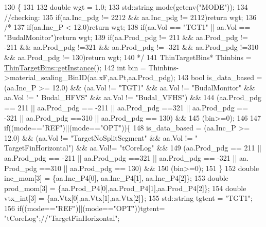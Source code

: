 \begin{DoxyCode}
130                                                                                \{
131 
132     \textcolor{keywordtype}{double} wgt = 1.0;
133     std::string mode(getenv(\textcolor{stringliteral}{"MODE"}));
134     \textcolor{comment}{//checking:}
135     \textcolor{keywordflow}{if}(aa.Inc\_pdg != 2212 && aa.Inc\_pdg != 2112)\textcolor{keywordflow}{return} wgt;
136     \textcolor{comment}{/*}
137 \textcolor{comment}{      if(aa.Inc\_P < 12.0)return wgt;}
138 \textcolor{comment}{      if(aa.Vol == "TGT1" || aa.Vol == "BudalMonitor")return wgt;}
139 \textcolor{comment}{      if(aa.Prod\_pdg != 211 && aa.Prod\_pdg != -211 && aa.Prod\_pdg !=321 && aa.Prod\_pdg != -321 &&
       aa.Prod\_pdg !=310 && aa.Prod\_pdg != 130)return wgt;}
140 \textcolor{comment}{    */}
141     ThinTargetBins*  Thinbins =  \hyperlink{class_neutrino_flux_reweight_1_1_thin_target_bins_aeff5cf7220dd08322f5abac2cbc7ff33}{ThinTargetBins::getInstance}();
142     \textcolor{keywordtype}{int} bin = Thinbins->material\_scaling\_BinID(aa.xF,aa.Pt,aa.Prod\_pdg);
143     \textcolor{keywordtype}{bool} is\_data\_based = (aa.Inc\_P >= 12.0) && (aa.Vol != \textcolor{stringliteral}{"TGT1"} && aa.Vol != \textcolor{stringliteral}{"BudalMonitor"} && aa.Vol != \textcolor{stringliteral}{"
      Budal\_HFVS"} && aa.Vol != \textcolor{stringliteral}{"Budal\_VFHS"}) && 
144       (aa.Prod\_pdg == 211 || aa.Prod\_pdg == -211 || aa.Prod\_pdg ==321 || aa.Prod\_pdg == -321 || aa.Prod\_pdg
       ==310 || aa.Prod\_pdg == 130) &&
145       (bin>=0);
146     
147     \textcolor{keywordflow}{if}((mode==\textcolor{stringliteral}{"REF"})||(mode==\textcolor{stringliteral}{"OPT"}))\{
148       is\_data\_based = (aa.Inc\_P >= 12.0) && (aa.Vol != \textcolor{stringliteral}{"TargetNoSplitSegment"} && aa.Vol != \textcolor{stringliteral}{"
      TargetFinHorizontal"}) && aa.Vol!= \textcolor{stringliteral}{"tCoreLog"} && 
149         (aa.Prod\_pdg == 211 || aa.Prod\_pdg == -211 || aa.Prod\_pdg ==321 || aa.Prod\_pdg == -321 || aa.
      Prod\_pdg ==310 || aa.Prod\_pdg == 130) &&
150         (bin>=0);
151     \}
152     \textcolor{keywordtype}{double} inc\_mom[3]  = \{aa.Inc\_P4[0], aa.Inc\_P4[1], aa.Inc\_P4[2]\};
153     \textcolor{keywordtype}{double} prod\_mom[3] = \{aa.Prod\_P4[0],aa.Prod\_P4[1],aa.Prod\_P4[2]\};
154     \textcolor{keywordtype}{double} vtx\_int[3]  = \{aa.Vtx[0],aa.Vtx[1],aa.Vtx[2]\};
155     std::string tgtent = \textcolor{stringliteral}{"TGT1"};
156     \textcolor{keywordflow}{if}((mode==\textcolor{stringliteral}{"REF"})||(mode==\textcolor{stringliteral}{"OPT"}))tgtent= \textcolor{stringliteral}{"tCoreLog"};\textcolor{comment}{//"TargetFinHorizontal";}

\end{DoxyCode}
